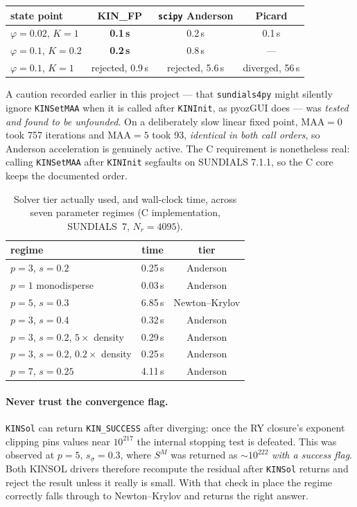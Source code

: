 \documentclass[11pt,a4paper]{article}
\newcommand{\code}[1]{\texttt{\hspace{0pt}#1}}
\begin{document}
\begin{center}
\begin{tabular}{lccc}
\toprule
state point & KIN\_FP & \code{scipy} Anderson & Picard\\
\midrule
$\varphi=0.02$, $K=1$ & \textbf{0.1\,s} & 0.2\,s & 0.1\,s\\
$\varphi=0.1$, $K=0.2$ & \textbf{0.2\,s} & 0.8\,s & ---\\
$\varphi=0.1$, $K=1$ & rejected, 0.9\,s & rejected, 5.6\,s & diverged, 56\,s\\
\bottomrule
\end{tabular}
\end{center}

A caution recorded earlier in this project --- that
\code{sundials4py} might silently ignore \code{KINSetMAA} when it is called
after \code{KINInit}, as pyozGUI does --- was \emph{tested and found to be
unfounded}. On a deliberately slow linear fixed point, MAA${}=0$ took 757
iterations and MAA${}=5$ took 93, \emph{identical in both call orders}, so
Anderson acceleration is genuinely active. The C requirement is nonetheless
real: calling \code{KINSetMAA} after \code{KINInit} segfaults on SUNDIALS
7.1.1, so the C core keeps the documented order.

\begin{table}[htbp]
\centering
\caption{Solver tier actually used, and wall-clock time, across seven
parameter regimes (C implementation, SUNDIALS~7, $N_r=4095$).}
\label{tab:tiers}
\begin{tabular}{lcc}
\toprule
regime & time & tier\\
\midrule
$p=3$, $s=0.2$              & 0.25\,s & Anderson\\
$p=1$ monodisperse          & 0.03\,s & Anderson\\
$p=5$, $s=0.3$              & 6.85\,s & Newton--Krylov\\
$p=3$, $s=0.4$              & 0.32\,s & Anderson\\
$p=3$, $s=0.2$, $5\times$ density   & 0.29\,s & Anderson\\
$p=3$, $s=0.2$, $0.2\times$ density & 0.25\,s & Anderson\\
$p=7$, $s=0.25$             & 4.11\,s & Anderson\\
\bottomrule
\end{tabular}
\end{table}

\paragraph{Never trust the convergence flag.} \code{KINSol} can return
\code{KIN\_SUCCESS} after diverging: once the RY closure's exponent clipping
pins values near $10^{217}$ the internal stopping test is defeated. This was
observed at $p=5$, $s_\sigma=0.3$, where $S^M$ was returned as
$\sim10^{222}$ \emph{with a success flag}. Both KINSOL drivers therefore
recompute the residual after \code{KINSol} returns and reject the result
unless it really is small. With that check in place the regime correctly falls
through to Newton--Krylov and returns the right answer.
\end{document}
